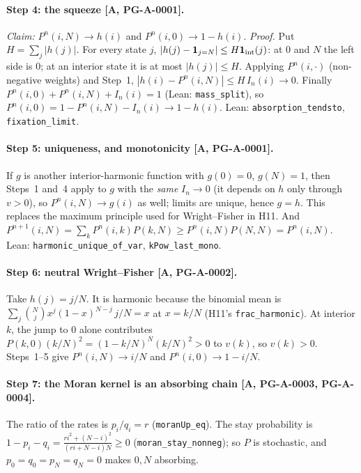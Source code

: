 \documentclass[11pt]{article}
\theoremstyle{remark}
\newcommand{\tier}[1]{\textsf{[#1]}}
\newcommand{\lean}[1]{\texttt{#1}}
\newcommand{\Pn}{P^{n}}
\begin{document}
\paragraph{Step 4: the squeeze \tier{A, PG-A-0001}.} \emph{Claim:} $\Pn(i,N)\to h(i)$ and $\Pn(i,0)\to1-h(i)$.
\emph{Proof.} Put $H=\sum_j|h(j)|$. For every state $j$, $|h(j)-\mathbf 1_{j=N}|\le H\mathbf 1_{\rm int}(j)$: at $0$ and $N$
the left side is $0$; at an interior state it is at most $|h(j)|\le H$. Applying $P^n(i,\cdot)$ (non-negative weights) and
Step~1,
$|h(i)-\Pn(i,N)|\le H\,I_n(i)\to0$. Finally $\Pn(i,0)+\Pn(i,N)+I_n(i)=1$ (Lean: \lean{mass\_split}), so
$\Pn(i,0)=1-\Pn(i,N)-I_n(i)\to1-h(i)$. Lean: \lean{absorption\_tendsto}, \lean{fixation\_limit}.

\paragraph{Step 5: uniqueness, and monotonicity \tier{A, PG-A-0001}.} If $g$ is another interior-harmonic function with
$g(0)=0$, $g(N)=1$, then Steps~1 and~4 apply to $g$ with the \emph{same} $I_n\to0$ (it depends on $h$ only through
$v>0$), so $\Pn(i,N)\to g(i)$ as well; limits are unique, hence $g=h$. This replaces the maximum principle used for
Wright--Fisher in H11. And $P^{n+1}(i,N)=\sum_kP^n(i,k)P(k,N)\ge P^n(i,N)P(N,N)=P^n(i,N)$.
Lean: \lean{harmonic\_unique\_of\_var}, \lean{kPow\_last\_mono}.



\paragraph{Step 6: neutral Wright--Fisher \tier{A, PG-A-0002}.} Take $h(j)=j/N$. It is harmonic because the binomial mean is
$\sum_j\binom Nj x^j(1-x)^{N-j}\,j/N=x$ at $x=k/N$ (H11's \lean{frac\_harmonic}). At interior $k$, the jump to $0$
alone contributes $P(k,0)(k/N)^2=(1-k/N)^N(k/N)^2>0$ to $v(k)$, so $v(k)>0$. Steps~1--5 give $\Pn(i,N)\to i/N$ and
$\Pn(i,0)\to1-i/N$.



\paragraph{Step 7: the Moran kernel is an absorbing chain \tier{A, PG-A-0003, PG-A-0004}.} The ratio of the rates is
$p_i/q_i=r$ (\lean{moranUp\_eq}). The stay probability is
$1-p_i-q_i=\frac{ri^2+(N-i)^2}{(ri+N-i)N}\ge0$ (\lean{moran\_stay\_nonneg}); so $P$ is stochastic, and $p_0=q_0=p_N=q_N=0$ makes
$0,N$ absorbing.
\end{document}

